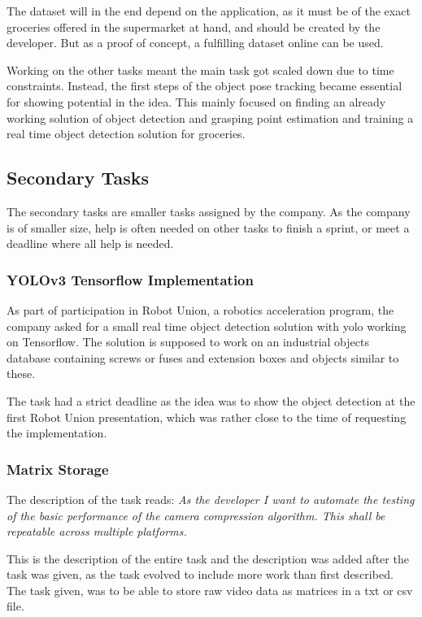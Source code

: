 The dataset will in the end depend on the application, as it must be of the exact groceries offered in the supermarket at hand, and should be created by the developer. But as a proof of concept, a fulfilling dataset online can be used.

Working on the other tasks meant the main task got scaled down due to time constraints. Instead, the first steps of the object pose tracking became essential for showing potential in the idea. This mainly focused on finding an already working solution of object detection and grasping point estimation and training a real time object detection solution for groceries.

\subsection{Secondary Tasks}
The secondary tasks are smaller tasks assigned by the company. As the company is of smaller size, help is often needed on other tasks to finish a sprint, or meet a deadline where all help is needed.

\subsubsection{YOLOv3 Tensorflow Implementation}
As part of participation in Robot Union, a robotics acceleration program, the company asked for a small real time object detection solution with \gls{yolo} working on Tensorflow. The solution is supposed to work on an industrial objects database containing screws or fuses and extension boxes and objects similar to these.

The task had a strict deadline as the idea was to show the object detection at the first Robot Union presentation, which was rather close to the time of requesting the implementation.

\subsubsection{Matrix Storage}
The description of the task reads: \textit{As the developer I want to automate the testing of the basic performance of the camera compression algorithm. This shall be repeatable across multiple platforms.}

This is the description of the entire task and the description was added after the task was given, as the task evolved to include more work than first described. The task given, was to be able to store raw video data as matrices in a txt or csv file.


